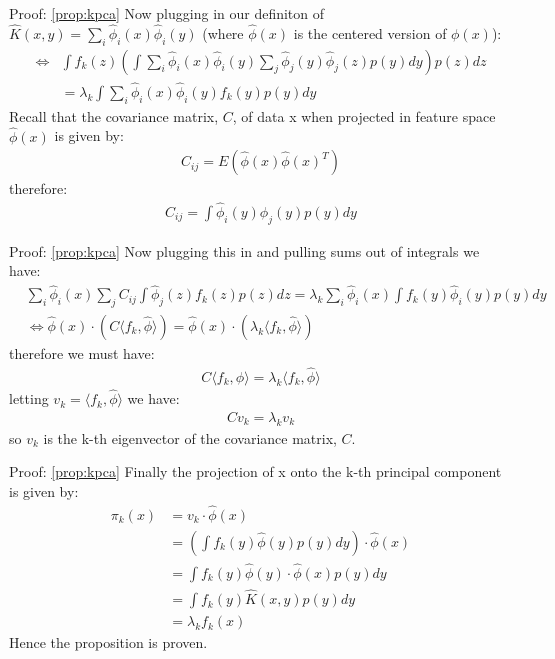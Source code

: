\documentclass[aspectratio=169]{beamer}
\begin{document}
\begin{frame}{Proof: \cref{prop:kpca}}
  Now plugging in our definiton of $\hat{K}(x,y) = \sum_{i} \hat{\phi}_{i}(x) \hat{\phi}_{i} (y)$ (where $\hat{\phi}(x)$ is the centered version of $\phi(x)$):
  \begin{align*}
    \iff &{} \int f_{k}(z) (\int \sum_{i} \hat{\phi}_{i}(x) \hat{\phi}_{i} (y) \sum_{j} \hat{\phi}_{j}(y) \hat{\phi}_{j} (z) p(y) dy) p(z) dz \\
    &= \lambda_{k} \int \sum_{i} \hat{\phi}_{i}(x) \hat{\phi}_{i} (y) f_{k}(y) p(y) dy 
  \end{align*} 
  Recall that the covariance matrix, $C$, of data x when projected in feature space $\hat{\phi}(x)$ is given by:
  \begin{align*}
    C_{ij} = E( \hat{\phi}(x) \hat{\phi}(x)^{T})
  \end{align*}
  therefore:
  \begin{align*}
    C_{ij} = \int \hat{\phi}_{i}(y) \hat{\phi}_{j}(y) p(y) dy 
  \end{align*}
\end{frame}

\begin{frame}{Proof: \cref{prop:kpca}}
  Now plugging this in and pulling sums out of integrals we have:
  \begin{align*}
    &{}\sum_{i} \hat{\phi}_{i}(x) \sum_{j} C_{ij} \int \hat{\phi}_{j}(z) f_{k}(z) p(z) dz = \lambda_{k} \sum_{i} \hat{\phi}_{i}(x) \int f_{k} (y) \hat{\phi}_{i}(y) p(y) dy \\
    & \iff \hat{\phi}(x) \cdot (C \langle f_{k}, \hat{\phi} \rangle) = \hat{\phi}(x) \cdot (\lambda_{k} \langle f_{k}, \hat{\phi} \rangle)   
  \end{align*}
  therefore we must have:
  \begin{align*}
    C \langle f_{k}, \hat{\phi} \rangle = \lambda_{k} \langle f_{k}, \hat{\phi} \rangle
  \end{align*}
  letting $v_{k} = \langle f_{k}, \hat{\phi} \rangle$ we have:
  \begin{align*}
    C v_{k} = \lambda_{k} v_{k}
  \end{align*}
  so $v_{k}$ is the k-th eigenvector of the covariance matrix, $C$.  
\end{frame}

\begin{frame}{Proof: \cref{prop:kpca}}
  Finally the projection of x onto the k-th principal component is given by:
  \begin{align*}
    \pi_{k} (x) &{}= v_{k} \cdot \hat{\phi}(x) \\
    &= (\int f_{k} (y) \hat{\phi}(y) p(y) dy) \cdot \hat{\phi}(x) \\
    &= \int f_{k} (y) \hat{\phi}(y) \cdot \hat{\phi}(x) p(y) dy \\
    &= \int f_{k} (y) \hat{K}(x,y) p(y) dy \\
    &= \lambda_{k} f_{k} (x)
  \end{align*}
  Hence the proposition is proven.
\end{frame}
\end{document}
